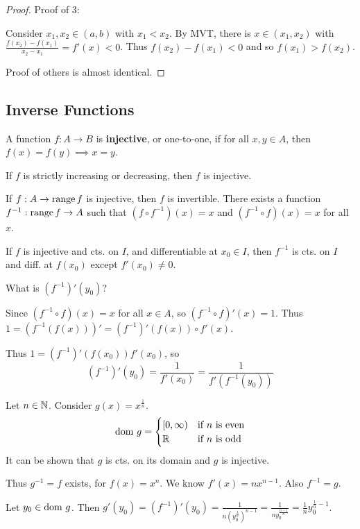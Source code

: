 \documentclass{article}
\begin{document}
\begin{proof}
    Proof of 3:

    Consider $x_1, x_2 \in (a, b)$ with $x_1 < x_2$. By MVT, there is $x \in (x_1, x_2)$ with $\frac{f(x_2) - f(x_1)}{x_2 - x_1} = f'(x) < 0$.
    Thus $f(x_2) - f(x_1) < 0$ and so $f(x_1) > f(x_2)$.

    Proof of others is almost identical.
\end{proof}
\subsection{Inverse Functions}
\begin{definition}
    A function $f: A \to B$ is \textbf{injective}, or one-to-one, if for all $x, y \in A$, then $f(x) = f(y) \implies x = y$.
\end{definition}
\begin{exercise}
    If $f$ is strictly increasing or decreasing, then $f$ is injective.
\end{exercise}
\begin{remark}
    If $f: A \to \operatorname{\text{range}} f$ is injective, then $f$ is invertible. There exists a function $f^{-1}: \operatorname{\text{range}} f \to A$ such that $(f \circ f^{-1})(x) = x$ and $(f^{-1} \circ f)(x) = x$ for all $x$.
\end{remark}
\begin{cthm}[Theorem 29.9]
    If $f$ is injective and cts. on $I$, and differentiable at $x_0 \in I$, then $f^{-1}$ is cts. on $I$ and diff. at $f(x_0)$ except $f'(x_0) \neq 0$.
\end{cthm}
\begin{remark}
    What is $(f^{-1})'(y_0)$?

    Since $(f^{-1} \circ f)(x) = x$ for all $x \in A$, so $(f^{-1} \circ f)'(x)= 1$. Thus $1 = (f^{-1}(f(x)))' = (f^{-1})'(f(x)) \circ f'(x)$.
    
    Thus $1 = (f^{-1})'(f(x_0))f'(x_0)$, so \[
    (f^{-1})'(y_0) = \frac{1}{f'(x_0)} = \frac{1}{f'(f^{-1}(y_0))}
    \]
\end{remark}
\begin{example}
    Let $n \in \mathbb{N}$. Consider $g(x) = x^{\frac{1}{n}}$. 
    \[
    \text{dom } g = \begin{cases}
        [0, \infty) &\text{if $n$ is even}\\
        \mathbb{R} &\text{if $n$ is odd}\\
    \end{cases}
    \]
    It can be shown that $g$ is cts. on its domain and $g$ is injective.

    Thus $g^{-1} = f$ exists, for $f(x) = x^n$. We know $f'(x) = nx^{n-1}$. Also $f^{-1} = g$.

    Let $y_0 \in \text{dom } g$. Then $g'(y_0) = (f^{-1})'(y_0) = \frac{1}{n(y_0^{\frac{1}{n}})^{n-1}} = \frac{1}{ny_0^{\frac{n-1}{n}}} = \frac{1}{n}y_0^{\frac{1}{n} - 1}$.
\end{example}
\end{document}
